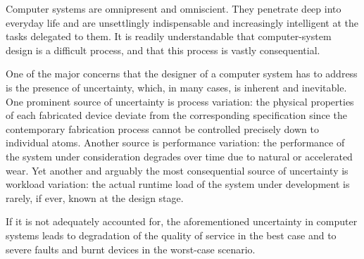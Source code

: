 Computer systems are omnipresent and omniscient. They penetrate deep into
everyday life and are unsettlingly indispensable and increasingly intelligent at
the tasks delegated to them. It is readily understandable that computer-system
design is a difficult process, and that this process is vastly consequential.

One of the major concerns that the designer of a computer system has to address
is the presence of uncertainty, which, in many cases, is inherent and
inevitable. One prominent source of uncertainty is process variation: the
physical properties of each fabricated device deviate from the corresponding
specification since the contemporary fabrication process cannot be controlled
precisely down to individual atoms. Another source is performance variation: the
performance of the system under consideration degrades over time due to natural
or accelerated wear. Yet another and arguably the most consequential source of
uncertainty is workload variation: the actual runtime load of the system under
development is rarely, if ever, known at the design stage.

If it is not adequately accounted for, the aforementioned uncertainty in
computer systems leads to degradation of the quality of service in the best case
and to severe faults and burnt devices in the worst-case scenario.
